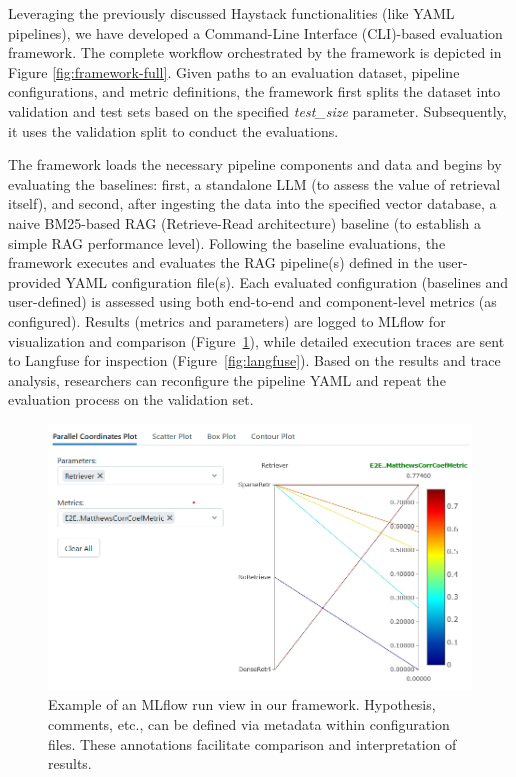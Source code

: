 Leveraging the previously discussed Haystack functionalities (like YAML pipe\-lines), we have developed a Command-Line Interface (CLI)-based evaluation framework. The complete workflow orchestrated by the framework is depicted in Figure \ref{fig:framework-full}. Given paths to an evaluation dataset, pipeline configurations, and metric definitions, the framework first splits the dataset into validation and test sets based on the specified \textit{test\_size} parameter. Subsequently, it uses the validation split to conduct the evaluations.

The framework loads the necessary pipeline components and data and begins by evaluating the baselines: first, a standalone LLM (to assess the value of retrieval itself), and second, after ingesting the data into the specified vector database, a naive BM25-based RAG (Retrieve-Read architecture) baseline (to establish a simple RAG performance level). Following the baseline evaluations, the framework executes and evaluates the RAG pipeline(s) defined in the user-provided YAML configuration file(s). Each evaluated configuration (baselines and user-defined) is assessed using both end-to-end and component-level metrics (as configured). Results (metrics and parameters) are logged to MLflow for visualization and comparison (Figure~\ref{fig:mlflow}), while detailed execution traces are sent to Langfuse for inspection (Figure~\ref{fig:langfuse}). Based on the results and trace analysis, researchers can reconfigure the pipeline YAML and repeat the evaluation process on the validation set.

\begin{figure}[!ht]
  \centering
  \includegraphics[width=\textwidth]{images/MLFlow-Vis.png}
  \caption{Example of an MLflow run view in our framework. Hypothesis, comments, etc., can be defined via metadata within configuration files. These annotations facilitate comparison and interpretation of results.}
  \label{fig:mlflow}
\end{figure}

